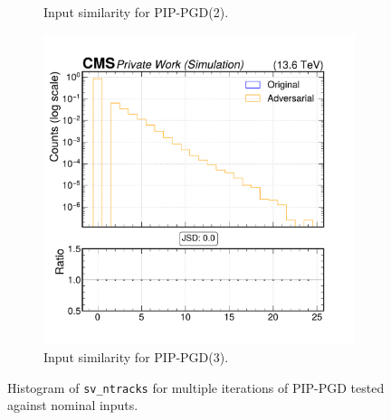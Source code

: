 \begin{figure}[h]
\begin{subfigure}[t]{0.32\textwidth}
    \caption*{Input similarity for PIP-PGD(2).}
  \end{subfigure}\hfill
  \begin{subfigure}[t]{0.32\textwidth}
    \includegraphics[width=\linewidth]{media/output/features/compare/combined_it_3/cmp_vtx_arr_sv_ntracks.pdf}
    \caption*{Input similarity for PIP-PGD(3).}
  \end{subfigure}

  \caption*{Histogram of \texttt{sv\_ntracks} for multiple iterations of PIP-PGD tested against nominal inputs.}
  \label{fig:combined_input_sv_ntracks}
\end{figure}

